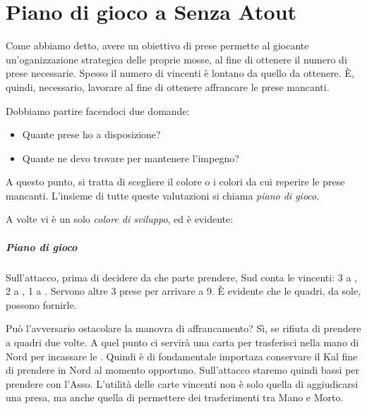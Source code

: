 \documentclass[../corsofiori.tex]{subfiles}
\begin{document}
\chapter{Piano di gioco a Senza Atout}

Come abbiamo detto, avere un obiettivo di prese permette al giocante un'oganizzazione strategica delle proprie mosse, al
fine di ottenere il numero di prese necessarie.
Spesso il numero di vincenti è lontano da quello da ottenere. \`E, quindi, necessario, lavorare al fine di ottenere
affrancare le prese mancanti.

Dobbiamo partire facendoci due domande:
\begin{itemize}
    \item Quante prese ho a disposizione?
    \item Quante ne devo trovare per mantenere l'impegno?
\end{itemize}

A questo punto, si tratta di scegliere il colore o i colori da cui reperire le prese mancanti.
L'insieme di tutte queste valutazioni si chiama \emph{piano di gioco}.

A volte vi è un solo \emph{colore di sviluppo}, ed è evidente:

\newgame
{}
\leftupper{\boardtext*}%
{\dealertext\quad}{\vulnertext}
\rightlower[2ex]{\lead: 2\He}{}{}

\showAll*

\paragraph{Piano di gioco} Sull'attacco, prima di decidere da che parte prendere, Sud conta le vincenti: 3 a \pic,
2 a \cu, 1 a \fio. Servono altre 3 prese per arrivare a 9. \`E evidente che le quadri, da sole, possono fornirle.

Può l'avversario ostacolare la manovra di affrancamento? Sì, se rifiuta di prendere a quadri due volte. A quel punto ci
servirà una carta per trasferisci nella mano di Nord per incassare le \qu. Quindi è di fondamentale importaza conservare
il K\He al fine di prendere in Nord al momento opportuno. Sull'attacco staremo quindi bassi per prendere con l'Asso.
L'utilità delle carte vincenti non è solo quella di aggiudicarsi una presa, ma anche quella di permettere dei
trasferimenti tra Mano e Morto.
\end{document}
